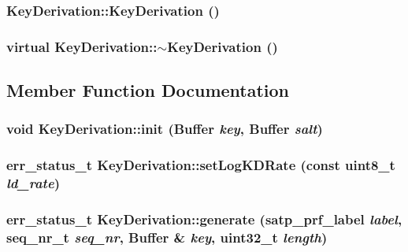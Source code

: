 \subsubsection{\setlength{\rightskip}{0pt plus 5cm}Key\-Derivation::Key\-Derivation ()\hspace{0.3cm}{\tt  [inline]}}\label{classKeyDerivation_07c3735d1b2e1285b6c427a2706ebc67}


\subsubsection{\setlength{\rightskip}{0pt plus 5cm}virtual Key\-Derivation::$\sim$Key\-Derivation ()\hspace{0.3cm}{\tt  [inline, virtual]}}\label{classKeyDerivation_ccce2c32370be2388ca0a977fef1f6cc}




\subsection{Member Function Documentation}
\subsubsection{\setlength{\rightskip}{0pt plus 5cm}void Key\-Derivation::init ({\bf Buffer} {\em key}, {\bf Buffer} {\em salt})}\label{classKeyDerivation_5f03e97de1a041f6012d1fcfabf13773}


\subsubsection{\setlength{\rightskip}{0pt plus 5cm}err\_\-status\_\-t Key\-Derivation::set\-Log\-KDRate (const uint8\_\-t {\em ld\_\-rate})}\label{classKeyDerivation_1c6d7a055b6b5b88076e15218f936663}


\subsubsection{\setlength{\rightskip}{0pt plus 5cm}err\_\-status\_\-t Key\-Derivation::generate ({\bf satp\_\-prf\_\-label} {\em label}, {\bf seq\_\-nr\_\-t} {\em seq\_\-nr}, {\bf Buffer} \& {\em key}, uint32\_\-t {\em length})}\label{classKeyDerivation_025e21ecdd0389b768eaa61fed660c86}



